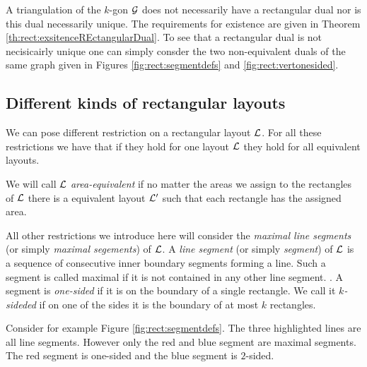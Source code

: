   A triangulation of the $k$-gon $\mathcal{G}$ does not necessarily have a rectangular dual nor is this dual necessarily unique. The requirements for existence are given in Theorem \ref{th:rect:exsitenceREctangularDual}. To see that a rectangular  dual is not necisicairly unique one can simply consder the two non-equivalent duals of the same graph given in Figures \ref{fig:rect:segmentdefs} and \ref{fig:rect:vertonesided}.



\subsection{Different kinds of rectangular layouts}
  We can pose different restriction on a rectangular layout $\mathcal{L}$. For all these restrictions we have that if they hold for one layout $\mathcal{L}$ they hold for all equivalent layouts.

  We will call $\mathcal{L}$ \emph{area-equivalent} if no matter the areas we assign to the rectangles of $\mathcal{L}$ there is a equivalent layout $\mathcal{L}'$ such that each rectangle has the assigned area.

  All other restrictions we introduce here will consider the \emph{maximal line segments} (or simply \emph{maximal segements}) of $\mathcal{L}$. A \emph{line segment} (or simply \emph{segment}) of $\mathcal{L}$ is a sequence of consecutive inner boundary segments forming a line. Such a segment is called maximal if it is not contained in any other line segment. .
  A segment is \emph{one-sided} if it is on the boundary of a single rectangle. We call it \emph{$k$-sideded} if on one of the sides it is the boundary of at most $k$ rectangles.

  Consider for example Figure \ref{fig:rect:segmentdefs}. The three highlighted lines are all line segments. However only the red and blue segment are maximal segments. The red segment is one-sided and the blue segment is $2$-sided.


